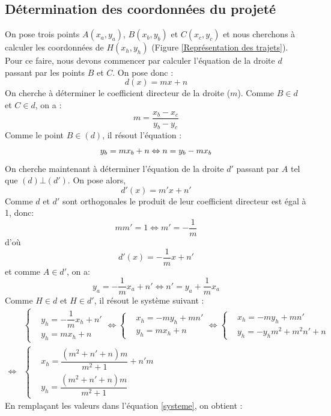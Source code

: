 \subsection{Détermination des coordonnées du projeté}
On pose trois points $ A(x_a,y_a) $, $ B(x_b,y_b) $ et $ C(x_c,y_c) $ et nous cherchons à calculer les coordonnées de $ H(x_h,y_h) $ (Figure \ref{Représentation des trajets}).
Pour ce faire, nous devons commencer par calculer l'équation de la droite $ d $ passant par les points $B$ et $C$.
On pose donc : 
\[
 	d(x) = mx + n
\]
On cherche à déterminer le coefficient directeur de la droite ($m$). Comme $B \in d$ et $C \in d$, on a :
\[
   m =  \frac{x_b-x_c}{y_b-y_c}
\]
Comme le point $B \in (d)$, il résout l'équation :
\[
   y_b = mx_b + n \\
   \Leftrightarrow n = y_b - mx_b
\]
On cherche maintenant à déterminer l'équation de la droite $ d' $ passant par $ A $ tel que $ (d)\bot (d') $. On pose alors, 
\[
 	d'(x) = m'x + n'
\]
Comme $d$ et $d'$ sont orthogonales le produit de leur coefficient directeur est égal à 1, donc:
\[
	mm' = 1 \Leftrightarrow m' = -\frac{1}{m}	
\]
d'où
\[
	d'(x) = -\frac{1}{m}x+n'
\]
et comme $ A \in d' $, on a:
\[
	y_a = -\frac{1}{m}x_a + n' \Leftrightarrow n' = y_a + \frac{1}{m}x_a
\]
Comme $ H \in d$ et $H \in d'$, il résout le système suivant :
\begin{align}
    &\begin{cases}
   		 & y_h = -\dfrac{1}{m}x_h + n'\\
   		 & y_h = mx_h + n
    \end{cases} 
    \Leftrightarrow
    \begin{cases}
   		& x_h = -my_h + mn'\\
    	& y_h = mx_h + n
    \end{cases} 
    \Leftrightarrow
    \begin{cases}
   		& x_h = -my_h + mn'\\
    	& y_h = -y_hm^2 + m^2n' + n
    \end{cases} \\
    \Leftrightarrow
    \label{systeme}
    &\begin{cases}
   		& x_h = \dfrac{(m^2+n'+n)m}{m^2+1} + n'm \\
    	& y_h = \dfrac{(m^2+n'+n)m}{m^2+1}
    \end{cases}
\end{align}
En remplaçant les valeurs dans l'équation \eqref{systeme}, on obtient :

